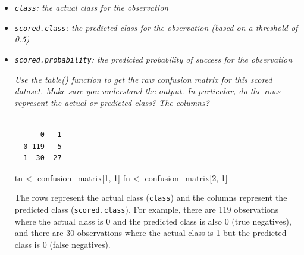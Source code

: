 \documentclass[
  11pt]{article}
\newenvironment{Shaded}{\begin{snugshade}}{\end{snugshade}}
\newcommand{\DecValTok}[1]{\textcolor[rgb]{0.68,0.00,0.00}{#1}}
\newcommand{\FunctionTok}[1]{\textcolor[rgb]{0.28,0.35,0.67}{#1}}
\newcommand{\NormalTok}[1]{\textcolor[rgb]{0.00,0.23,0.31}{#1}}
\newcommand{\OtherTok}[1]{\textcolor[rgb]{0.00,0.23,0.31}{#1}}
\newcommand{\SpecialCharTok}[1]{\textcolor[rgb]{0.37,0.37,0.37}{#1}}
\begin{document}
\begin{itemize}
\item
  \emph{\texttt{class}: the actual class for the observation}
\item
  \emph{\texttt{scored.class}: the predicted class for the observation
  (based on a threshold of 0.5)}
\item
  \emph{\texttt{scored.probability}: the predicted probability of
  success for the observation}

  \emph{Use the table() function to get the raw confusion matrix for
  this scored dataset. Make sure you understand the output. In
  particular, do the rows represent the actual or predicted class? The
  columns?}

\begin{Shaded}
\end{Shaded}

\begin{verbatim}

      0   1
  0 119   5
  1  30  27
\end{verbatim}

\begin{Shaded}
\begin{Highlighting}[]
\NormalTok{tn }\OtherTok{\textless{}{-}}\NormalTok{ confusion\_matrix[}\DecValTok{1}\NormalTok{, }\DecValTok{1}\NormalTok{]}
\NormalTok{fn }\OtherTok{\textless{}{-}}\NormalTok{ confusion\_matrix[}\DecValTok{2}\NormalTok{, }\DecValTok{1}\NormalTok{]}
\end{Highlighting}
\end{Shaded}

  The rows represent the actual class (\texttt{class}) and the columns
  represent the predicted class (\texttt{scored.class}). For example,
  there are 119 observations where the actual class is 0 and the
  predicted class is also 0 (true negatives), and there are 30
  observations where the actual class is 1 but the predicted class is 0
  (false negatives).
\end{itemize}
\end{document}
